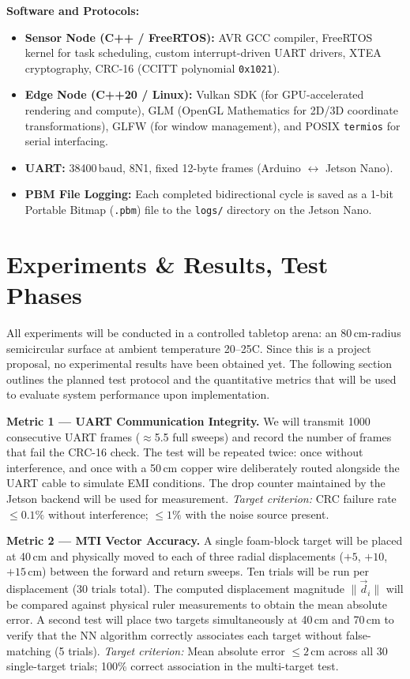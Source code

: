\documentclass[14pt]{article}
\begin{document}
\textbf{Software and Protocols:}
\begin{itemize}
    \item \textbf{Sensor Node (C++ / FreeRTOS):} AVR GCC compiler, FreeRTOS kernel for task scheduling, custom interrupt-driven UART drivers, XTEA cryptography, CRC-16 (CCITT polynomial \texttt{0x1021}).
    \item \textbf{Edge Node (C++20 / Linux):} Vulkan SDK (for GPU-accelerated rendering and compute), GLM (OpenGL Mathematics for 2D/3D coordinate transformations), GLFW (for window management), and POSIX \texttt{termios} for serial interfacing.
    \item \textbf{UART:} 38400\,baud, 8N1, fixed 12-byte frames (Arduino $\leftrightarrow$ Jetson Nano).
    \item \textbf{PBM File Logging:} Each completed bidirectional cycle is saved as a 1-bit Portable Bitmap (\texttt{.pbm}) file to the \texttt{logs/} directory on the Jetson Nano.
\end{itemize}

\section{Experiments \& Results, Test Phases}

All experiments will be conducted in a controlled tabletop arena: an
80\,cm-radius semicircular surface at ambient temperature 20--25\textdegree C.
Since this is a project proposal, no experimental results have been obtained
yet. The following section outlines the planned test protocol and the
quantitative metrics that will be used to evaluate system performance upon
implementation.

\textbf{Metric 1 --- UART Communication Integrity.}
We will transmit 1000 consecutive UART frames ($\approx$5.5 full sweeps) and
record the number of frames that fail the CRC-16 check. The test will be
repeated twice: once without interference, and once with a 50\,cm copper wire
deliberately routed alongside the UART cable to simulate EMI conditions. The
drop counter maintained by the Jetson backend will be used for measurement.
\textit{Target criterion:} CRC failure rate $\leq 0.1\%$ without interference;
$\leq 1\%$ with the noise source present.

\textbf{Metric 2 --- MTI Vector Accuracy.}
A single foam-block target will be placed at 40\,cm and physically moved to
each of three radial displacements ($+5$, $+10$, $+15$\,cm) between the
forward and return sweeps. Ten trials will be run per displacement (30 trials
total). The computed displacement magnitude $\|\vec{d}_i\|$ will be compared
against physical ruler measurements to obtain the mean absolute error. A
second test will place two targets simultaneously at 40\,cm and 70\,cm to
verify that the NN algorithm correctly associates each target without
false-matching (5 trials).
\textit{Target criterion:} Mean absolute error $\leq 2\,\text{cm}$ across
all 30 single-target trials; 100\% correct association in the multi-target
test.
\end{document}
